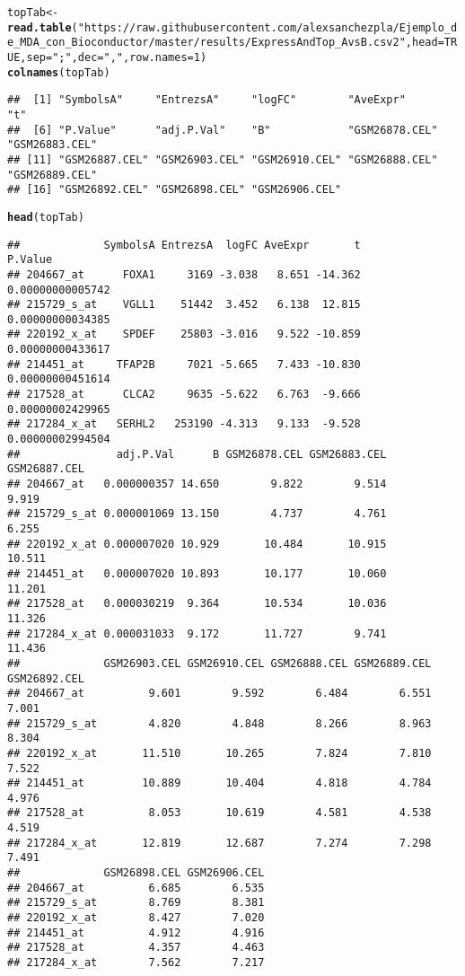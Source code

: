 \documentclass{article}\usepackage[]{graphicx}\usepackage[]{color}
\makeatletter
\newcommand{\hlnum}[1]{\textcolor[rgb]{0.686,0.059,0.569}{#1}}%
\newcommand{\hlstr}[1]{\textcolor[rgb]{0.192,0.494,0.8}{#1}}%
\newcommand{\hlstd}[1]{\textcolor[rgb]{0.345,0.345,0.345}{#1}}%
\newcommand{\hlkwb}[1]{\textcolor[rgb]{0.69,0.353,0.396}{#1}}%
\newcommand{\hlkwc}[1]{\textcolor[rgb]{0.333,0.667,0.333}{#1}}%
\newcommand{\hlkwd}[1]{\textcolor[rgb]{0.737,0.353,0.396}{\textbf{#1}}}%
\newenvironment{kframe}{%
 \def\at@end@of@kframe{}%
 \ifinner\ifhmode%
  \def\at@end@of@kframe{\end{minipage}}%
  \begin{minipage}{\columnwidth}%
 \fi\fi%
 \def\FrameCommand##1{\hskip\@totalleftmargin \hskip-\fboxsep
 \colorbox{shadecolor}{##1}\hskip-\fboxsep
     \hskip-\linewidth \hskip-\@totalleftmargin \hskip\columnwidth}%
 \MakeFramed {\advance\hsize-\width
   \@totalleftmargin\z@ \linewidth\hsize
   \@setminipage}}%
 {\par\unskip\endMakeFramed%
 \at@end@of@kframe}
\newenvironment{knitrout}{}{} %
\makeatother
\begin{document}
\begin{knitrout}
\color{fgcolor}\begin{kframe}
\begin{alltt}
\hlstd{topTab} \hlkwb{<-} \hlkwd{read.table}\hlstd{(}\hlstr{"https://raw.githubusercontent.com/alexsanchezpla/Ejemplo_de_MDA_con_Bioconductor/master/results/ExpressAndTop_AvsB.csv2"}\hlstd{,} \hlkwc{head}\hlstd{=}\hlnum{TRUE}\hlstd{,} \hlkwc{sep}\hlstd{=}\hlstr{";"}\hlstd{,} \hlkwc{dec}\hlstd{=}\hlstr{","}\hlstd{,} \hlkwc{row.names} \hlstd{=} \hlnum{1}\hlstd{)}
\hlkwd{colnames}\hlstd{(topTab)}
\end{alltt}
\begin{verbatim}
##  [1] "SymbolsA"     "EntrezsA"     "logFC"        "AveExpr"      "t"           
##  [6] "P.Value"      "adj.P.Val"    "B"            "GSM26878.CEL" "GSM26883.CEL"
## [11] "GSM26887.CEL" "GSM26903.CEL" "GSM26910.CEL" "GSM26888.CEL" "GSM26889.CEL"
## [16] "GSM26892.CEL" "GSM26898.CEL" "GSM26906.CEL"
\end{verbatim}
\begin{alltt}
\hlkwd{head}\hlstd{(topTab)}
\end{alltt}
\begin{verbatim}
##             SymbolsA EntrezsA  logFC AveExpr       t          P.Value
## 204667_at      FOXA1     3169 -3.038   8.651 -14.362 0.00000000005742
## 215729_s_at    VGLL1    51442  3.452   6.138  12.815 0.00000000034385
## 220192_x_at    SPDEF    25803 -3.016   9.522 -10.859 0.00000000433617
## 214451_at     TFAP2B     7021 -5.665   7.433 -10.830 0.00000000451614
## 217528_at      CLCA2     9635 -5.622   6.763  -9.666 0.00000002429965
## 217284_x_at   SERHL2   253190 -4.313   9.133  -9.528 0.00000002994504
##               adj.P.Val      B GSM26878.CEL GSM26883.CEL GSM26887.CEL
## 204667_at   0.000000357 14.650        9.822        9.514        9.919
## 215729_s_at 0.000001069 13.150        4.737        4.761        6.255
## 220192_x_at 0.000007020 10.929       10.484       10.915       10.511
## 214451_at   0.000007020 10.893       10.177       10.060       11.201
## 217528_at   0.000030219  9.364       10.534       10.036       11.326
## 217284_x_at 0.000031033  9.172       11.727        9.741       11.436
##             GSM26903.CEL GSM26910.CEL GSM26888.CEL GSM26889.CEL GSM26892.CEL
## 204667_at          9.601        9.592        6.484        6.551        7.001
## 215729_s_at        4.820        4.848        8.266        8.963        8.304
## 220192_x_at       11.510       10.265        7.824        7.810        7.522
## 214451_at         10.889       10.404        4.818        4.784        4.976
## 217528_at          8.053       10.619        4.581        4.538        4.519
## 217284_x_at       12.819       12.687        7.274        7.298        7.491
##             GSM26898.CEL GSM26906.CEL
## 204667_at          6.685        6.535
## 215729_s_at        8.769        8.381
## 220192_x_at        8.427        7.020
## 214451_at          4.912        4.916
## 217528_at          4.357        4.463
## 217284_x_at        7.562        7.217
\end{verbatim}
\end{kframe}
\end{knitrout}
\end{document}
